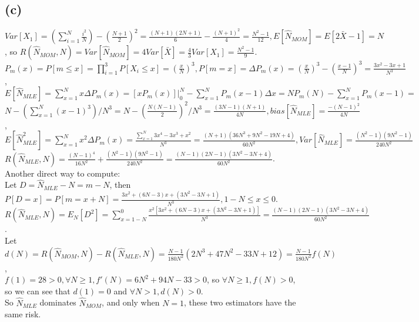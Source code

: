 \subsection*{(c)}
$
Var[X_1] =
\left(\sum_{i=1}^{N} \frac{i^2}{N}\right) - \left(\frac{N+1}{2}\right)^2 =
\frac{(N+1)(2N+1)}{6} - \frac{(N+1)^2}{4} =
\frac{N^2-1}{12},
E[\hat{N}_{MOM}] =
E[2\bar{X}-1] = N
$, so
$
R(\hat{N}_{MOM},N) =
Var[\hat{N}_{MOM}] =
4Var[\bar{X}] =
\frac{4}{3} Var[X_1] = \frac{N^2-1}{9}
$.
\\
$
P_m(x) = P[m \leq x] = \prod_{i=1}^{3}P[X_i \leq x] =
\left(\frac{x}{N}\right)^3,
P[m = x] = \Delta P_m(x) =
\left(\frac{x}{N}\right)^3 -
\left(\frac{x-1}{N}\right)^3 =
\frac{3x^2-3x+1}{N^3}
$, \\
$
E[\hat{N}_{MLE}]=
\sum_{x=1}^{N} x\Delta P_m(x) =
[xP_m(x)] |_{0}^{N} - \sum_{x=1}^{N} P_m(x-1) \Delta x =
N P_m(N) - \sum_{x=1}^{N} P_m(x-1) =
$\\
$
N - \left(\sum_{x=1}^{N} (x-1)^3\right)/N^3 =
N - \left(\frac{N(N-1)}{2}\right)^2/N^3 =
\frac{(3N-1)(N+1)}{4N},
bias[\hat{N}_{MLE}] = \frac{-(N-1)^2}{4N}
$,\\
$
E[\hat{N}_{MLE}^2]=
\sum_{x=1}^{N} x^2\Delta P_m(x) =
\frac{\sum_{x=1}^{N} 3x^4 - 3x^3 + x^2}{N^3} =
\frac{(N+1)(36N^3+ 9N^2 - 19N + 4)}{60N^2},
Var[\hat{N}_{MLE}]=
\frac{(N^2-1)(9N^2-1)}{240N^2}
$ \\
$
R(\hat{N}_{MLE}, N) =
\frac{(N-1)^4}{16N^2} + 
\frac{(N^2-1)(9N^2-1)}{240N^2} =
\frac{(N-1) (2N-1) (3N^2-3N+4)}{60N^2}
$. Another direct way to compute: \\
Let
$
D = \hat{N}_{MLE}-N = m-N
$,
then
$
P[D=x] = P[m = x+N] =
\frac{3x^2 + (6N-3)x + (3N^2 - 3N + 1)}{N^3}
, 1-N \leq x \leq 0
$.\\
$
R(\hat{N}_{MLE}, N) =
E_N[D^2] =
\sum_{x=1-N}^{0} \frac{x^2[3x^2 + (6N-3)x + (3N^2 - 3N + 1)]}{N^3} =
\frac{(N-1)(2N-1)(3N^2 - 3N + 4)}{60N^2}
$. \\
Let
$
d(N) = {R(\hat{N}_{MOM}, N)} - {R(\hat{N}_{MLE}, N)} =
\frac{N-1}{180N^2}(2N^3+47N^2 -33N +12) =
\frac{N-1}{180N^2}f(N)
$,\\
$
f(1) = 28 >0,
\forall N \geq 1, f'(N) = 6N^2+94N-33 > 0
$, so
$
\forall N \geq 1, f(N)>0
$, \\
so we can see that
$
d(1) = 0
$
and
$
\forall N > 1, d(N) > 0
$. \\
So
$
\hat{N}_{MLE}
$
dominates
$
\hat{N}_{MOM}
$, 
and only when $N=1$, these two estimators have the same risk.

